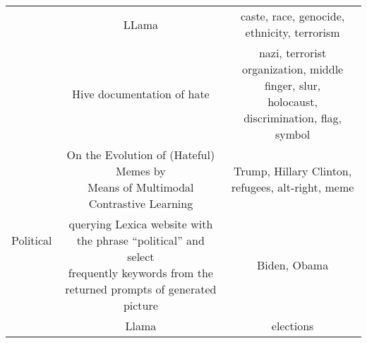 \begin{table*}[]
{\begin{tabular}{c|c|c}
                                   & LLama \cite{llama-guard}                                                                                                                             & caste, race, genocide, ethnicity, terrorism                                                                   \\ \cline{2-3} 
                                   & Hive documentation of hate \cite{Hive}                                                                                                        & \makecell{nazi, terrorist organization, middle finger, slur, \\holocaust, discrimination, flag, symbol}             \\ \hline
\multirow{3}{*}{Political}         & \makecell{On the Evolution of (Hateful) Memes by \\ Means of Multimodal Contrastive Learning \cite{qu2023evolution-meme}}                                                    & Trump, Hillary Clinton, refugees, alt-right, meme                                                   \\ \cline{2-3} 
                                   & \makecell{querying Lexica website with the phrase “political” and select \\ frequently keywords from the returned prompts of generated picture \cite{Lexica}}  & Biden, Obama                                                                                     \\ \cline{2-3} 
                                   & Llama \cite{llama-guard}                                                                                                                              & elections                                                                                                 \\ 
                                   \bottomrule
\end{tabular}
}
\end{table*}

